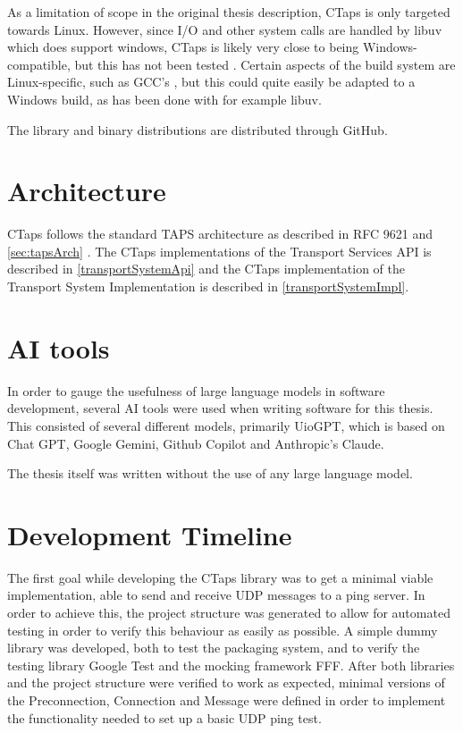 As a limitation of scope in the original thesis description, CTaps is only
targeted towards Linux. However, since I/O and other system calls are handled
by libuv which does support windows, CTaps is likely very close to being
Windows-compatible, but this has not been tested \cite{Libuv2025}.
Certain aspects of the build system are Linux-specific, such as GCC's
, but this could quite
easily be adapted to a Windows build, as has been done with for example
libuv.

The library and binary distributions are distributed through GitHub.

\section{Architecture}
CTaps follows the standard TAPS architecture as described in RFC 9621 
and \cref{sec:tapsArch} \cite{paulyArchitectureRequirementsTransport2025}.
The CTaps implementations of the Transport Services API is described in
\cref{transportSystemApi} and the CTaps implementation of the
Transport System Implementation is described in \cref{transportSystemImpl}.

\section{AI tools}
In order to gauge the usefulness of large language models in software development,
several AI tools were used when writing software for this thesis. This consisted
of several different models, primarily UioGPT, which is based on Chat GPT, 
Google Gemini, Github Copilot and Anthropic's Claude. 

The thesis itself was written without the use of any large language model.

\section{Development Timeline} \label{projectTimeline}
The first goal while developing the CTaps library was to get a minimal viable implementation,
able to send and receive UDP messages to a ping server. In order to
achieve this, the project structure was generated to allow for automated
testing in order to verify this behaviour as easily as possible.
A simple dummy library was developed, both to test the packaging system,
and to verify the testing library Google Test and the mocking framework FFF.
After both libraries and the project structure were verified to work
as expected, minimal versions of the Preconnection, Connection and Message
were defined in order to implement the functionality needed to set up a
basic UDP ping test.

